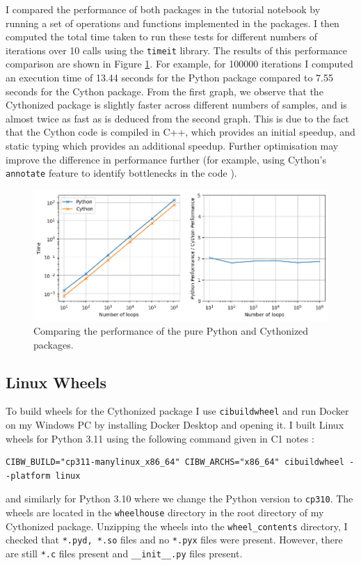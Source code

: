 \documentclass{article}
\begin{document}
I compared the performance of both packages in the tutorial notebook by running a set of operations and functions implemented in the packages. I then computed the total time taken to run these tests for different numbers of iterations over 10 calls using the \texttt{timeit} library. The results of this performance comparison are shown in Figure \ref{fig:q9_timeit}. For example, for 100000 iterations I computed an execution time of 13.44 seconds for the Python package compared to 7.55 seconds for the Cython package. From the first graph, we observe that the Cythonized package is slightly faster across different numbers of samples, and is almost twice as fast as is deduced from the second graph. This is due to the fact that the Cython code is compiled in C++, which provides an initial speedup, and static typing which provides an additional speedup. Further optimisation may improve the difference in performance further (for example, using Cython's \texttt{annotate} feature to identify bottlenecks in the code \cite{neurohackweek_cython_annotations}).

\begin{figure}
    \centering
    \includegraphics[width=1\linewidth]{q9_timeit.png}
    \caption{Comparing the performance of the pure Python and Cythonized packages.}
    \label{fig:q9_timeit}
\end{figure}

\subsection{Linux Wheels}
To build wheels for the Cythonized package I use \texttt{cibuildwheel} and run Docker on my Windows PC by installing Docker Desktop and opening it. I built Linux wheels for Python 3.11 using the following command given in C1 notes \cite{research_computing_docs}:
\begin{lstlisting}[style=mypythonstyle]
    CIBW_BUILD="cp311-manylinux_x86_64" CIBW_ARCHS="x86_64" cibuildwheel --platform linux
\end{lstlisting}
 and similarly for Python 3.10 where we change the Python version to \texttt{cp310}. The wheels are located in the \texttt{wheelhouse} directory in the root directory of my Cythonized package. Unzipping the wheels into the \texttt{wheel\_contents} directory, I checked that \texttt{*.pyd, *.so} files and no \texttt{*.pyx} files were present. However, there are still \texttt{*.c} files present and \texttt{\_\_init\_\_.py} files present.
\end{document}
